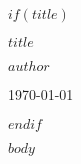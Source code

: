 \documentclass[11pt,a4paper]{article}
\begin{document}
$if(title)$
\thispagestyle{empty}
\begin{center}
\vspace*{3cm}
{\Huge\bfseries\color{heading}$title$\par}
\vspace{2cm}
{\Large\itshape\color{subtle}$author$\par}
\vfill
{\large\color{subtle}\today\par}
\end{center}
\clearpage
$endif$

$body$
\end{document}
